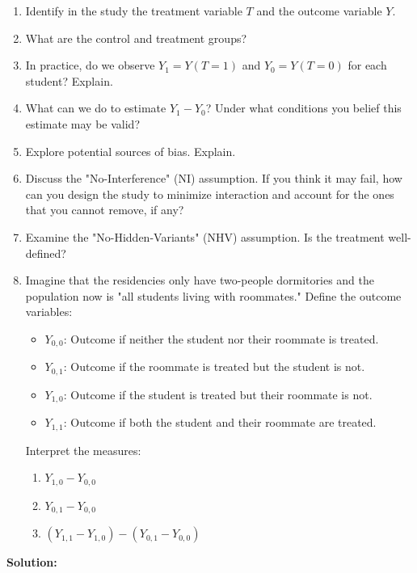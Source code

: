 \documentclass[12pt]{article}
\newif\ifsolutions
\begin{document}
\begin{enumerate}
    \begin{enumerate}[label=(\alph*)]
        \item Identify in the study the treatment variable $T$ and the outcome variable $Y$.
        \item What are the control and treatment groups?
        \item In practice, do we observe $Y_1 = Y(T = 1)$ and $Y_0 = Y(T = 0)$ for each student? Explain. 
        \item What can we do to estimate $Y_1 - Y_0$? Under what conditions you belief this estimate may be valid?
        \item Explore potential sources of bias. Explain.
        \item Discuss the "No-Interference" (NI) assumption. If you think it may fail, how can you design the study to minimize interaction and account for the ones that you cannot remove, if any?
        \item Examine the "No-Hidden-Variants" (NHV) assumption. Is the treatment well-defined?
        \item Imagine that the residencies only have two-people dormitories and the population now is "all students living with roommates." Define the outcome variables:
        \begin{itemize}
            \item \( Y_{0,0} \): Outcome if neither the student nor their roommate is treated.
            \item \( Y_{0,1} \): Outcome if the roommate is treated but the student is not.
            \item \( Y_{1,0} \): Outcome if the student is treated but their roommate is not.
            \item \( Y_{1,1} \): Outcome if both the student and their roommate are treated.
        \end{itemize}
        Interpret the measures:
        \begin{enumerate}[label=(\roman*)]
            \item \(Y_{1,0} - Y_{0,0} \)
            \item \(Y_{0,1} - Y_{0,0} \)
            \item \((Y_{1,1} - Y_{1,0}) - (Y_{0,1} - Y_{0,0}) \)
        \end{enumerate}
    \end{enumerate}
    
\ifsolutions \color{blue} \textbf{Solution:} \\


\end{enumerate}
\end{document}
